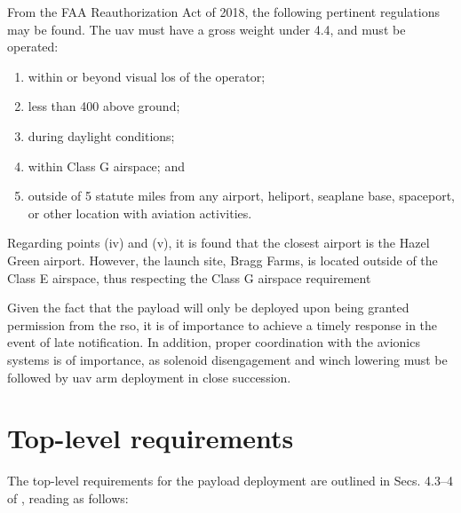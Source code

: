 From the FAA Reauthorization Act of 2018, the following pertinent regulations may be found. The \gls{uav} must have a gross weight under \SI{4.4}{\poundm}, and must be operated:

\begin{enumerate}[noitemsep, label=(\roman*)]
	\item within or beyond visual \gls{los} of the operator;
	\item less than \SI{400}{\feet} above ground;
	\item during daylight conditions;
	\item within Class G airspace; and
	\item outside of 5 statute miles from any airport, heliport, seaplane base, spaceport, or other location with aviation activities.
\end{enumerate}

Regarding points (iv) and (v), it is found that the closest airport is the Hazel Green airport. However, the launch site, Bragg Farms, is located outside of the Class E airspace, thus respecting the Class G airspace requirement  

 Given the fact that the payload will only be deployed upon being granted permission from the \gls{rso}, it is of importance to achieve a timely response in the event of late notification. In addition, proper coordination with the avionics systems is of importance, as solenoid disengagement and winch lowering must be followed by \gls{uav} arm deployment in close succession.

\section{Top-level requirements}

The top-level requirements for the payload deployment are outlined in Secs. 4.3--4 of \citep{MSFC2019}, reading as follows:

